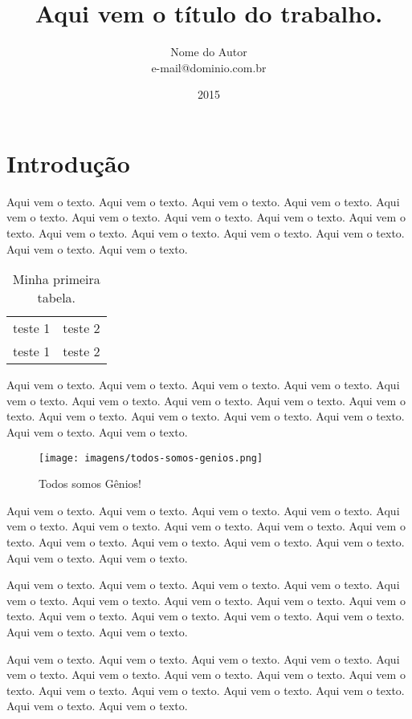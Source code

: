 \documentclass[a4paper, 12pt]{article}
\title{Aqui vem o título do trabalho. }
\author{Nome do Autor \\ e-mail@dominio.com.br}
\date{2015}
\begin{document}
\maketitle
\tableofcontents \newpage
\listoffigures \newpage

\section{Introdução}

Aqui vem o texto. Aqui vem o texto. Aqui vem o texto. Aqui vem o texto. Aqui vem o texto. Aqui vem o texto. Aqui vem o texto. Aqui vem o texto. Aqui vem o texto. Aqui vem o texto. Aqui vem o texto. Aqui vem o texto. Aqui vem o texto. Aqui vem o texto. Aqui vem o texto.

\begin{table}[htb]
\centering 
\begin{tabular}{|c|c|}
teste 1 & teste 2\\
teste 1 & teste 2\\
\end{tabular}
\caption{Minha primeira tabela. }
\label{minha-tabela}
\end{table}

Aqui vem o texto. Aqui vem o texto. Aqui vem o texto. Aqui vem o texto. Aqui vem o texto. Aqui vem o texto. Aqui vem o texto. Aqui vem o texto. Aqui vem o texto. Aqui vem o texto. Aqui vem o texto. Aqui vem o texto. Aqui vem o texto. Aqui vem o texto. Aqui vem o texto.

\begin{figure}[htb]
\centering
\texttt{[image: imagens/todos-somos-genios.png]}
\caption{Todos somos Gênios!}
\label{figura-genios}
\end{figure}

Aqui vem o texto. Aqui vem o texto. Aqui vem o texto. Aqui vem o texto. Aqui vem o texto. Aqui vem o texto. Aqui vem o texto. Aqui vem o texto. Aqui vem o texto. Aqui vem o texto. Aqui vem o texto. Aqui vem o texto. Aqui vem o texto. Aqui vem o texto. Aqui vem o texto.

Aqui vem o texto. Aqui vem o texto. Aqui vem o texto. Aqui vem o texto. Aqui vem o texto. Aqui vem o texto. Aqui vem o texto. Aqui vem o texto. Aqui vem o texto. Aqui vem o texto. Aqui vem o texto. Aqui vem o texto. Aqui vem o texto. Aqui vem o texto. Aqui vem o texto.

Aqui vem o texto. Aqui vem o texto. Aqui vem o texto. Aqui vem o texto. Aqui vem o texto. Aqui vem o texto. Aqui vem o texto. Aqui vem o texto. Aqui vem o texto. Aqui vem o texto. Aqui vem o texto. Aqui vem o texto. Aqui vem o texto. Aqui vem o texto. Aqui vem o texto.
\end{document}
